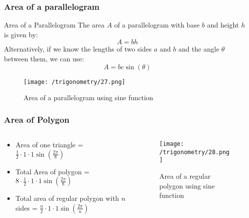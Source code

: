 \documentclass{beamer}
\begin{document}
    \begin{frame}
        \frametitle{Area of a parallelogram}
        \begin{block}{Area of a Parallelogram}
            The area \(A\) of a parallelogram with base \(b\) and height \(h\) is given by:
            \[
            A = b h
            \]
            Alternatively, if we know the lengths of two sides \(a\) and \(b\) and the angle \(\theta\) between them, we can use:
            \[
            A =  bc \sin(\theta)
            \]
        \end{block}
        \begin{figure}
            \centering
            \texttt{[image: /trigonometry/27.png]}
            \caption{Area of a parallelogram using sine function}
        \end{figure}
    \end{frame}

    \begin{frame}
        \frametitle{Area of Polygon}
        \begin{columns}
            \begin{column}{0.5\textwidth}
                \begin{itemize}
                    \item Area of one triangle = \(\frac{1}{2} \cdot 1 \cdot 1 \sin(\frac{2\pi}{8})\)
                    \item Total Area of polygon = \(8 \cdot \frac{1}{2} \cdot 1 \cdot 1 \sin(\frac{2\pi}{8})\)
                    \item Total area of regular polygon with \(n\) sides = \(\frac{n}{2} \cdot 1 \cdot 1 \sin(\frac{2\pi}{n})\)
                \end{itemize}
            \end{column}
            \begin{column}{0.5\textwidth}
                \begin{figure}
                    \centering
                    \texttt{[image: /trigonometry/28.png]}
                    \caption{Area of a regular polygon using sine function}
                \end{figure}
            \end{column}
        \end{columns}
    \end{frame}
    
\end{document}
